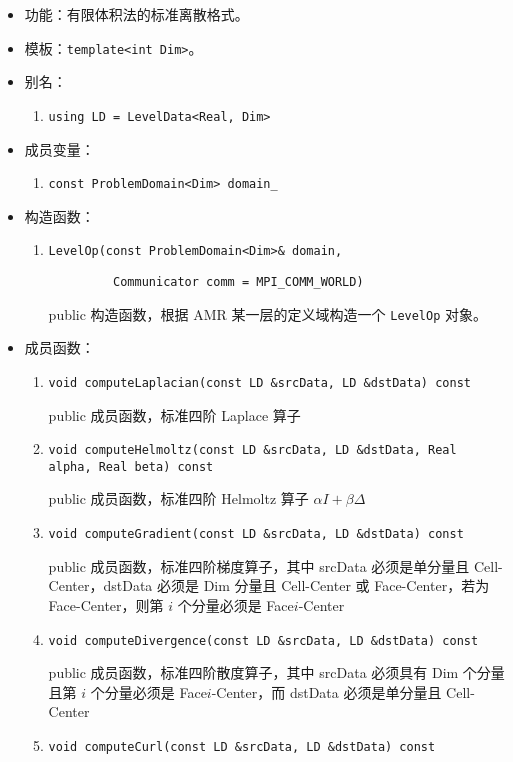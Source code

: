 \documentclass[cn, bibend=bibtex]{elegantpaper}
\theoremstyle{plain}
\begin{document}
\begin{itemize}
  \item 功能：有限体积法的标准离散格式。
  \item 模板：\lstinline|template<int Dim>|。
  \item 别名：
  \begin{enumerate}
      \item \lstinline|using LD = LevelData<Real, Dim>|
  \end{enumerate}
  \item 成员变量：
  \begin{enumerate}
    \item \lstinline|const ProblemDomain<Dim> domain_|
  \end{enumerate}
  \item 构造函数：
  \begin{enumerate}
    \item \lstinline|LevelOp(const ProblemDomain<Dim>& domain,|
    
          \lstinline|         Communicator comm = MPI_COMM_WORLD)|

    public 构造函数，根据 AMR 某一层的定义域构造一个 \lstinline|LevelOp| 对象。
  \end{enumerate}
  \item 成员函数：
  \begin{enumerate}  
    \item \lstinline|void computeLaplacian(const LD &srcData, LD &dstData) const|

    public 成员函数，标准四阶 Laplace 算子
    \item \lstinline|void computeHelmoltz(const LD &srcData, LD &dstData, Real alpha, Real beta) const|

    public 成员函数，标准四阶 Helmoltz 算子 $\alpha I + \beta \Delta$
    \item \lstinline|void computeGradient(const LD &srcData, LD &dstData) const|

    public 成员函数，标准四阶梯度算子，其中 srcData 必须是单分量且 Cell-Center，dstData 必须是 Dim 分量且 Cell-Center 或 Face-Center，若为 Face-Center，则第 $i$ 个分量必须是 Face$i$-Center
    \item \lstinline|void computeDivergence(const LD &srcData, LD &dstData) const|

    public 成员函数，标准四阶散度算子，其中 srcData 必须具有 Dim 个分量且第 $i$ 个分量必须是 Face$i$-Center，而 dstData 必须是单分量且 Cell-Center
    \item \lstinline|void computeCurl(const LD &srcData, LD &dstData) const|


\end{enumerate}
\end{itemize}
\end{document}
